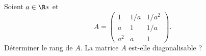 \begin{enonce}
\begin{exercise}[ID={RMS 122-2 E1314 CCP PC},subtitle={},tags={}, difficulty={0}]
Soient $a\in\R*$ et 
\begin{equation*}
A=
\begin{pmatrix}
1   & 1/a & 1/a^2\\
a   & 1   & 1/a\\
a^2 & a   & 1
\end{pmatrix}.
\end{equation*}
Déterminer le rang de $A$.
La matrice $A$ est-elle diagonalisable ?
\end{exercise}
\begin{solution}
\end{solution}
\end{enonce}
